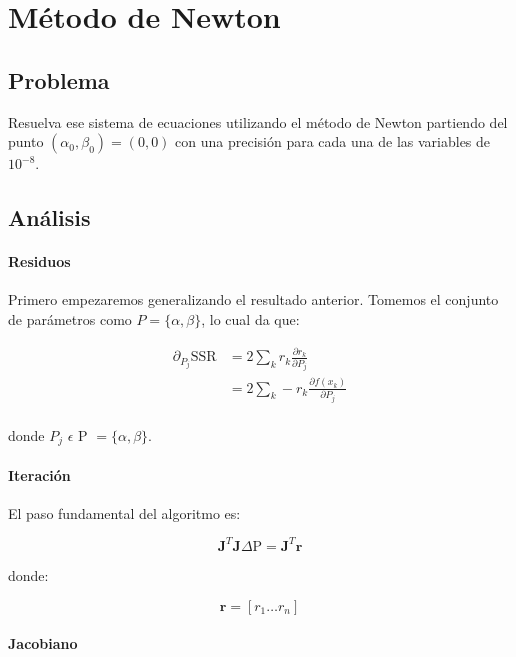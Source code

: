 \section{Método de Newton}

\subsection{Problema}

Resuelva ese sistema de ecuaciones utilizando el método de Newton partiendo del punto $(\alpha_0 , \beta_0) = (0,0)$ con una precisión para cada una de las variables de $10^{-8}$.

\subsection{Análisis}

\paragraph{Residuos}

Primero empezaremos generalizando el resultado anterior. 
Tomemos el conjunto de parámetros como $ P = \{\alpha, \beta\}$, lo cual da que:

\begin{align*}
	\partial_{P_j} \text{SSR} 
	&= 2 \sum_{k} r_k \frac{\partial r_k}{\partial P_j} \\
	&= 2 \sum_{k} - r_k \frac{ \partial f(x_k)}{\partial P_j} \\
\end{align*}

donde $P_j$ $\epsilon$ P $= \{\alpha, \beta\}$.

\paragraph{Iteración}

El paso fundamental del algoritmo es:

\begin{equation}
	\textbf{J}^T\textbf{J} \Delta \text{P} = \textbf{J}^T  \textbf{r}
\end{equation}

donde:

\begin{equation*}
	\textbf{r} = [r_1 \dots r_n ]
\end{equation*}

\paragraph{Jacobiano}

